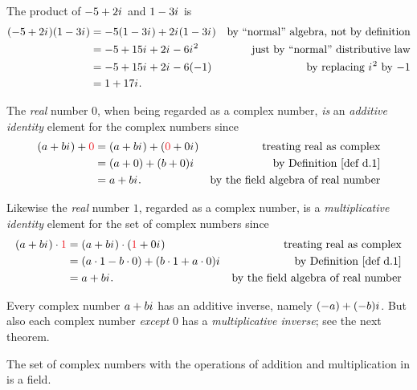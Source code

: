 \begin{example} \label{example d.2}
The product of \(-5 + 2{i\mkern1mu}\) and \(1 - 3{i\mkern1mu}\) is
\begin{align*}
    (-5 + 2{i\mkern1mu})(1 - 3{i\mkern1mu}) & = -5(1 - 3{i\mkern1mu}) + 2{i\mkern1mu}(1 - 3{i\mkern1mu}) & \text{by ``normal'' algebra, not by definition} \\
        & = -5 + 15{i\mkern1mu} + 2{i\mkern1mu} - 6{i\mkern1mu}^2 & \text{just by ``normal'' distributive law} \\
        & = -5 + 15{i\mkern1mu} + 2{i\mkern1mu} - 6(-1) & \text{by replacing \({i\mkern1mu}^2\) by \(-1\)} \\
        & = 1 + 17{i\mkern1mu}.
\end{align*}
\end{example}

\begin{remark} \label{remark d.3}
The \emph{real} number \(0\), when being regarded as a complex number, \emph{is} an \emph{additive identity} element for the complex numbers since
\begin{align*}
    (a + b\iu) + \RED{0} & = (a + b\iu) + (\RED{0} + 0\iu) & \text{treating real as complex} \\
        & = (a + 0) + (b + 0)\iu & \text{by \DEF{d.1}} \\
        & = a + b\iu. & \text{by the field algebra of real number}
\end{align*}

Likewise the \emph{real} number \(1\), regarded as a complex number, is a \emph{multiplicative identity} element for the set of complex numbers since
\begin{align*}
    (a + b\iu) \cdot \RED{1} & = (a + b\iu) \cdot (\RED{1} + 0\iu) & \text{treating real as complex} \\
        & = (a \cdot 1 - b \cdot 0) + (b \cdot 1 + a \cdot 0)\iu & \text{by \DEF{d.1}} \\
        & = a + b\iu. & \text{by the field algebra of real number}
\end{align*}

Every complex number \(a + b{i\mkern1mu}\) has an additive inverse, namely \((-a) + (-b){i\mkern1mu}\).
But also each complex number \emph{except} \(0\) has a \emph{multiplicative inverse}; see the next theorem.
\end{remark}

\begin{appendix theorem} \label{thm d.1}
The set of complex numbers with the operations of addition and multiplication in  is a field.
\end{appendix theorem}


